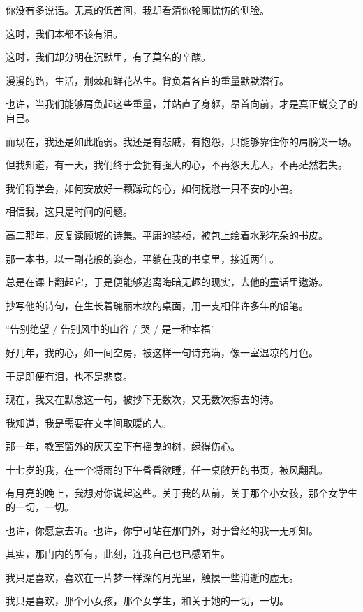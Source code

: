 		你没有多说话。无意的低首间，我却看清你轮廓忧伤的侧脸。\par
		这时，我们本都不该有泪。\par
		这时，我们却分明在沉默里，有了莫名的辛酸。\par
		漫漫的路，生活，荆棘和鲜花丛生。背负着各自的重量默默潜行。\par
		也许，当我们能够肩负起这些重量，并站直了身躯，昂首向前，才是真正蜕变了的自己。\par
		而现在，我还是如此脆弱。我还是有悲戚，有抱怨，只能够靠住你的肩膀哭一场。\par
		但我知道，有一天，我们终于会拥有强大的心，不再怨天尤人，不再茫然若失。\par
		我们将学会，如何安放好一颗躁动的心，如何抚慰一只不安的小兽。\par
		相信我，这只是时间的问题。

		高二那年，反复读顾城的诗集。平庸的装祯，被包上绘着水彩花朵的书皮。\par
		那一本书，以一副花般的姿态，平躺在我的书桌里，接近两年。\par
		总是在课上翻起它，于是便能够逃离晦暗无趣的现实，去他的童话里遨游。\par
		抄写他的诗句，在生长着瑰丽木纹的桌面，用一支相伴许多年的铅笔。\par
		“告别绝望 / 告别风中的山谷 / 哭 / 是一种幸福”\par
		好几年，我的心，如一间空房，被这样一句诗充满，像一室温凉的月色。\par
		于是即便有泪，也不是悲哀。\par
		现在，我又在默念这一句，被抄下无数次，又无数次擦去的诗。\par
		我知道，我是需要在文字间取暖的人。\par
		那一年，教室窗外的灰天空下有摇曳的树，绿得伤心。\par
		十七岁的我，在一个将雨的下午昏昏欲睡，任一桌敞开的书页，被风翻乱。

		有月亮的晚上，我想对你说起这些。关于我的从前，关于那个小女孩，那个女学生的一切，一切。\par
		也许，你愿意去听。也许，你宁可站在那门外，对于曾经的我一无所知。\par
		其实，那门内的所有，此刻，连我自己也已感陌生。\par
		我只是喜欢，喜欢在一片梦一样深的月光里，触摸一些消逝的虚无。\par
		我只是喜欢，那个小女孩，那个女学生，和关于她的一切，一切。

